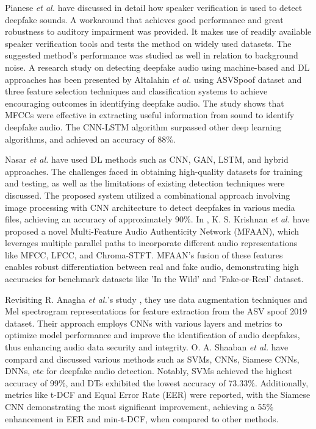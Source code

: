 \documentclass[conference]{IEEEtran}
\begin{document}
Pianese \textit{et al.} \cite{b7} have discussed in detail how speaker verification is used to detect deepfake sounds. A workaround that achieves good performance and great robustness to auditory impairment was provided. It makes use of readily available speaker verification tools and tests the method on widely used datasets. The suggested method's performance was studied as well in relation to background noise. 
A research study on detecting deepfake audio using machine-based and DL approaches has been presented by Altalahin \textit{et al.} \cite{b8} using ASVSpoof dataset and three feature selection techniques and classification systems to achieve encouraging outcomes in identifying deepfake audio. The study shows that MFCCs were effective in extracting useful information from sound to identify deepfake audio. The CNN-LSTM algorithm surpassed other deep learning algorithms, and achieved an accuracy of 88\%. 

Nasar \textit{et al.} \cite{b9} have used DL methods such as CNN, GAN, LSTM, and hybrid approaches. The challenges faced in obtaining high-quality datasets for training and testing, as well as the limitations of existing detection techniques were discussed. The proposed system utilized a combinational approach involving image processing with CNN architecture to detect deepfakes in various media files, achieving an accuracy of approximately 90\%.
In \cite{b10}, K. S. Krishnan \textit{et al.} have proposed a novel Multi-Feature Audio Authenticity Network (MFAAN), which leverages multiple parallel paths to incorporate different audio representations like MFCC, LFCC, and Chroma-STFT. MFAAN's fusion of these features enables robust differentiation between real and fake audio, demonstrating high accuracies for benchmark datasets like 'In the Wild' and 'Fake-or-Real' dataset.

Revisiting R. Anagha \textit{et al.}'s study \cite{b11}, they use data augmentation techniques and Mel spectrogram representations for feature extraction from the ASV spoof 2019 dataset. Their approach employs CNNs with various layers and metrics to optimize model performance and improve the identification of audio deepfakes, thus enhancing audio data security and integrity.
O. A. Shaaban \textit{et al.} \cite{b12} have compard and discussed various methods such as SVMs, CNNs, Siamese CNNs, DNNs, etc for deepfake audio detection. Notably, SVMs achieved the highest accuracy of 99\%, and DTs exhibited the lowest accuracy of 73.33\%. Additionally, metrics like t-DCF and Equal Error Rate (EER) were reported, with the Siamese CNN demonstrating the most significant improvement, achieving a 55\% enhancement in EER and min-t-DCF, when compared to other methods.
\end{document}
